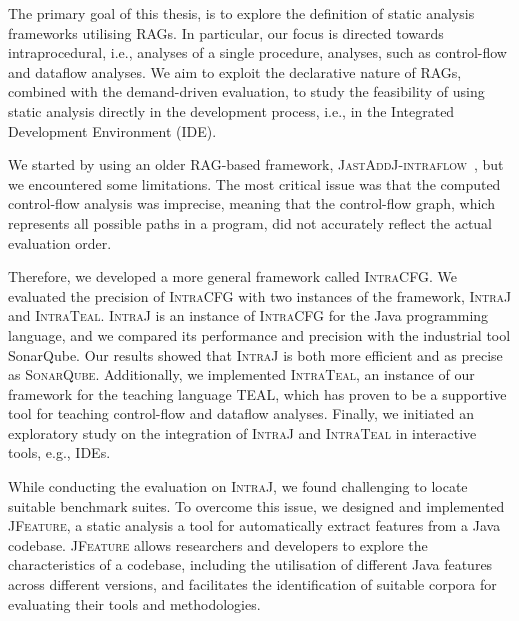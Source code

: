 The primary goal of this thesis, is to explore the definition of static analysis 
frameworks utilising RAGs. In particular, our focus is directed towards intraprocedural, i.e., analyses of a single procedure,
analyses, such as control-flow and dataflow analyses. We aim to exploit 
the declarative nature of RAGs, combined with the demand-driven evaluation, 
to study the feasibility of using static analysis directly in the development process, 
i.e., in the Integrated Development Environment (IDE).

We started by using an older RAG-based framework, \textsc{JastAddJ-intraflow}~\cite{10.1016/j.scico.2012.02.002},
but we encountered some limitations. The most critical issue was that the computed 
control-flow analysis was imprecise, meaning that the 
control-flow graph, which represents all possible paths in a program, did not 
accurately reflect the actual evaluation order.

Therefore, we developed a more general framework called \textsc{IntraCFG}.
We evaluated the precision of \textsc{IntraCFG} with two instances of the framework, 
\textsc{IntraJ} and \textsc{IntraTeal}. 
\textsc{IntraJ} is an instance of \textsc{IntraCFG} for the Java programming language,
and we compared its performance and precision with the industrial tool SonarQube. Our results 
showed that \textsc{IntraJ} is both more efficient and as precise as \textsc{SonarQube}. 
Additionally, we implemented \textsc{IntraTeal}, an instance of our framework for the teaching 
language TEAL, which has proven to be a supportive tool for teaching control-flow and 
dataflow analyses. Finally, we initiated an exploratory study on the integration of 
\textsc{IntraJ} and \textsc{IntraTeal} in interactive tools, e.g., IDEs.

While conducting the evaluation on \textsc{IntraJ}, we found challenging to locate suitable 
benchmark suites. To overcome this issue, we designed and implemented \textsc{JFeature}, 
a static analysis a tool for automatically extract features from a Java codebase.
\textsc{JFeature} allows researchers and developers to explore the characteristics of a 
codebase, including the utilisation of different Java features across different 
versions, and facilitates the identification of suitable corpora for evaluating 
their tools and methodologies.

